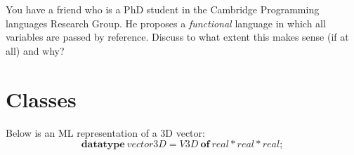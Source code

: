 \documentclass[10pt,a4paper]{exam}
\begin{document}
\begin{questions}
\question[6] You have a friend who is a PhD student in the Cambridge Programming languages Research Group. He proposes a \emph{functional} language in which all variables are passed by reference. Discuss to what extent this makes sense (if at all) and why? \droppoints 

\section*{Classes}

\question Below is an ML representation of a 3D vector:
\begin{displaymath}
\mathbf{datatype}~\mathit{vector3D} = \mathit{V3D}~\mathbf{of}~\mathit{real} * \mathit{real} * \mathit{real};
\end{displaymath}
\end{questions}
\end{document}
